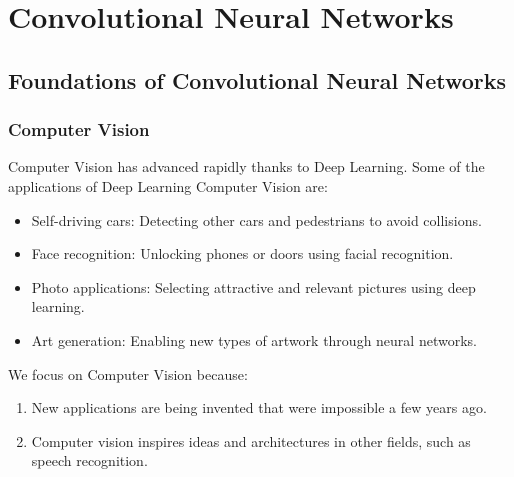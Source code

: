 \documentclass[letterpaper,12pt,notitlepage,twoside]{report}
\begin{document}
\chapter{Convolutional Neural Networks} \label{ch:4}
\section{Foundations of Convolutional Neural Networks}
\subsection{Computer Vision}
Computer Vision has advanced rapidly thanks to Deep Learning. Some of the applications of Deep Learning Computer Vision are: 
    \begin{itemize}[nosep]
        \item Self-driving cars: Detecting other cars and pedestrians to avoid collisions.
        \item Face recognition: Unlocking phones or doors using facial recognition.
        \item Photo applications: Selecting attractive and relevant pictures using deep learning.
        \item Art generation: Enabling new types of artwork through neural networks.
    \end{itemize}

We focus on Computer Vision because:
    \begin{enumerate}
        \item New applications are being invented that were impossible a few years ago.
        \item Computer vision inspires ideas and architectures in other fields, such as speech recognition.
    \end{enumerate}
\end{document}
